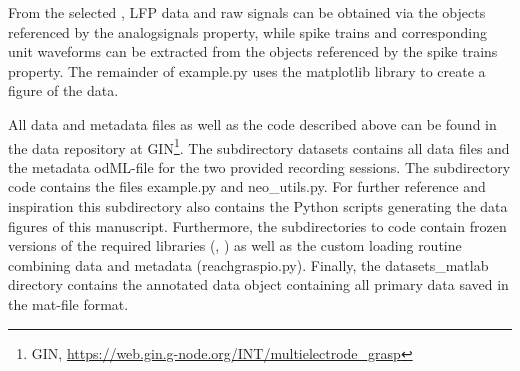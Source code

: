 From the selected , LFP data and raw signals can be obtained via the  objects referenced by the analogsignals property, while spike trains and corresponding unit waveforms can be extracted from the  objects referenced by the spike trains property. The remainder of example.py uses the matplotlib library to create a figure of the data.

All data and metadata files as well as the code described above can be found in the data repository at GIN\footnote{GIN, \url{https://web.gin.g-node.org/INT/multielectrode_grasp}}. The subdirectory datasets contains all data files and the metadata odML-file for the two provided recording sessions. The subdirectory code contains the files example.py and neo\_utils.py. For further reference and inspiration this subdirectory also contains the Python scripts generating the data figures of this manuscript. Furthermore, the subdirectories to code contain frozen versions of the required libraries (, ) as well as the custom loading routine combining data and metadata (reachgraspio.py). Finally, the datasets\_matlab directory contains the annotated  data object containing all primary data saved in the mat-file format.

